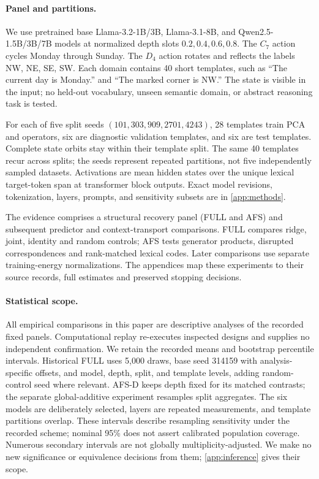 \documentclass{article}
\begin{document}
\paragraph{Panel and partitions.}
\label{sec:design}
We use pretrained base Llama-3.2-1B/3B, Llama-3.1-8B, and Qwen2.5-1.5B/3B/7B models at normalized depth slots $0.2,0.4,0.6,0.8$. The $C_7$ action cycles Monday through Sunday. The $D_4$ action rotates and reflects the labels NW, NE, SE, SW. Each domain contains 40 short templates, such as ``The current day is Monday.'' and ``The marked corner is NW.'' The state is visible in the input; no held-out vocabulary, unseen semantic domain, or abstract reasoning task is tested.

For each of five split seeds $(101,303,909,2701,4243)$, 28 templates train PCA and operators, six are diagnostic validation templates, and six are test templates. Complete state orbits stay within their template split. The same 40 templates recur across splits; the seeds represent repeated partitions, not five independently sampled datasets. Activations are mean hidden states over the unique lexical target-token span at transformer block outputs. Exact model revisions, tokenization, layers, prompts, and sensitivity subsets are in \cref{app:methods}.

The evidence comprises a structural recovery panel (FULL and AFS) and subsequent predictor and context-transport comparisons. FULL compares ridge, joint, identity and random controls; AFS tests generator products, disrupted correspondences and rank-matched lexical codes. Later comparisons use separate training-energy normalizations. The appendices map these experiments to their source records, full estimates and preserved stopping decisions.

\paragraph{Statistical scope.}
All empirical comparisons in this paper are descriptive analyses of the recorded fixed panels. Computational replay re-executes inspected designs and supplies no independent confirmation. We retain the recorded means and bootstrap percentile intervals. Historical FULL uses 5,000 draws, base seed 314159 with analysis-specific offsets, and model, depth, split, and template levels, adding random-control seed where relevant. AFS-D keeps depth fixed for its matched contrasts; the separate global-additive experiment resamples split aggregates. The six models are deliberately selected, layers are repeated measurements, and template partitions overlap. These intervals describe resampling sensitivity under the recorded scheme; nominal 95\% does not assert calibrated population coverage. Numerous secondary intervals are not globally multiplicity-adjusted. We make no new significance or equivalence decisions from them; \cref{app:inference} gives their scope.
\end{document}
